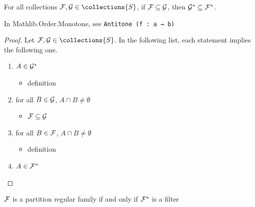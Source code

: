 \begin{theorem}
    \label{thm_dual_is_antitone}
    \leanok{}
    For all collections $\family, \familytwo \in \collections{S}$, if $\mathcal{F} \subseteq \mathcal{G}$, then $\mathcal{G}^* \subseteq \mathcal{F}^*$.
\end{theorem}

\begin{leanrmk}
    In Mathlib.Order.Monotone, see \verb|Antitone (f : a → b)|
\end{leanrmk}

\begin{proof}
    Let $\family, \familytwo \in \collections{S}$. In the following list, each statement implies the following one.
    \begin{enumerate}
        \item $A \in \mathcal{G}^*$
        \begin{itemize}
            \item[--] definition
        \end{itemize}
        \item for all $B \in \mathcal{G}$, $A \cap B \neq \emptyset$
        \begin{itemize}
            \item[--] $\mathcal{F} \subseteq \mathcal{G}$
        \end{itemize}
        \item for all $B \in \mathcal{F}$, $A \cap B \neq \emptyset$
        \begin{itemize}
            \item[--] definition
        \end{itemize}
        \item $A \in \mathcal{F}^*$
    \end{enumerate}
\end{proof}

\begin{theorem}
    \label{thm_pr_iff_dual_is_filter}
    \label{thm_family_pr_iff_dual_is_filter}
    $\mathcal{F}$ is a partition regular family if and only if $\mathcal{F}^*$ is a filter
\end{theorem}

